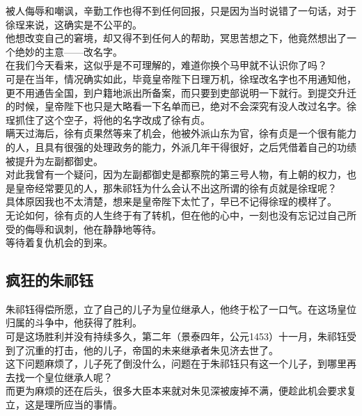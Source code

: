 \begin{multicols}{\theparacolNo}
被人侮辱和嘲讽，辛勤工作也得不到任何回报，只是因为当时说错了一句话，对于徐珵来说，这确实是不公平的。\\

他想改变自己的窘境，却又得不到任何人的帮助，冥思苦想之下，他竟然想出了一个绝妙的主意——改名字。\\

在我们今天看来，这似乎是不可理解的，难道你换个马甲就不认识你了吗？\\

可是在当年，情况确实如此，毕竟皇帝陛下日理万机，徐珵改名字也不用通知他，更不用通告全国，到户籍地派出所备案，而只要到吏部说明一下就行。到提交升迁的时候，皇帝陛下也只是大略看一下名单而已，绝对不会深究有没人改过名字。徐珵抓住了这个空子，将他的名字改成了徐有贞。\\

瞒天过海后，徐有贞果然等来了机会，他被外派山东为官，徐有贞是一个很有能力的人，且具有很强的处理政务的能力，外派几年干得很好，之后凭借着自己的功绩被提升为左副都御史。\\

对此我曾有一个疑问，因为左副都御史是都察院的第三号人物，有上朝的权力，也是皇帝经常要见的人，那朱祁钰为什么会认不出这所谓的徐有贞就是徐珵呢？\\

具体原因我也不太清楚，想来是皇帝陛下太忙了，早已不记得徐珵的模样了。\\

无论如何，徐有贞的人生终于有了转机，但在他的心中，一刻也没有忘记过自己所受的侮辱和讽刺，他在静静地等待。\\

等待着复仇机会的到来。\\

\subsection{疯狂的朱祁钰}
朱祁钰得偿所愿，立了自己的儿子为皇位继承人，他终于松了一口气。在这场皇位归属的斗争中，他获得了胜利。\\

可是这场胜利并没有持续多久，第二年（景泰四年，公元1453）十一月，朱祁钰受到了沉重的打击，他的儿子，帝国的未来继承者朱见济去世了。\\

这下问题麻烦了，儿子死了倒没什么，问题在于朱祁钰只有这一个儿子，到哪里再去找一个皇位继承人呢？\\

而更为麻烦的还在后头，很多大臣本来就对朱见深被废掉不满，便趁此机会要求复立，这是理所应当的事情。\\


\end{multicols}
